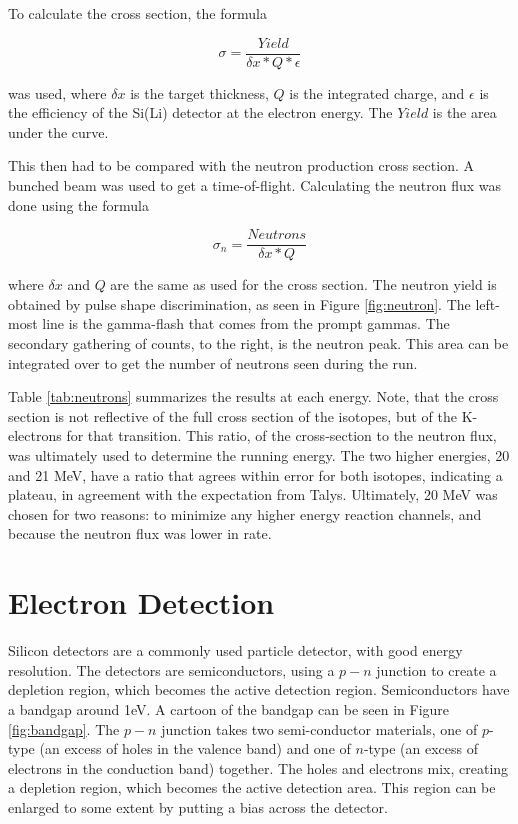 

To calculate the cross section, the formula

\begin{equation}
    \sigma=\frac{Yield}{\delta x*Q*\epsilon}
    \label{eq:xs}
\end{equation}

was used, where $\delta x$ is the target thickness, $Q$ is the integrated charge, and $\epsilon$ is the efficiency of the Si(Li) detector at the electron energy. The $Yield$ is the area under the curve.

This then had to be compared with the neutron production cross section. A bunched beam was used to get a time-of-flight. Calculating the neutron flux was done using the formula

\begin{equation}
    \sigma_n = \frac{Neutrons}{\delta x*Q}
\end{equation}

where $\delta x$ and $Q$ are the same as used for the cross section. The neutron yield is obtained by pulse shape discrimination, as seen in Figure \ref{fig:neutron}. The left-most line is the gamma-flash that comes from the prompt gammas. The secondary gathering of counts, to the right, is the neutron peak. This area can be integrated over to get the number of neutrons seen during the run.

Table \ref{tab:neutrons} summarizes the results at each energy. Note, that the cross section is not reflective of the full cross section of the isotopes, but of the K-electrons for that transition. This ratio, of the cross-section to the neutron flux, was ultimately used to determine the running energy. The two higher energies, 20 and 21 MeV, have a ratio that agrees within error for both isotopes, indicating a plateau, in agreement with the expectation from Talys. Ultimately, 20 MeV was chosen for two reasons: to minimize any higher energy reaction channels, and because the neutron flux was lower in rate.



\section{Electron Detection}

Silicon detectors are a commonly used particle detector, with good energy resolution. The detectors are semiconductors, using a $p-n$ junction to create a depletion region, which becomes the active detection region\citep{knoll00:rad_det_meas}. Semiconductors have a bandgap around 1eV. A cartoon of the bandgap can be seen in Figure \ref{fig:bandgap}. The $p-n$ junction takes two semi-conductor materials, one of $p$-type (an excess of holes in the valence band) and one of $n$-type (an excess of electrons in the conduction band) together. The holes and electrons mix, creating a depletion region, which becomes the active detection area. This region can be enlarged to some extent by putting a bias across the detector.

